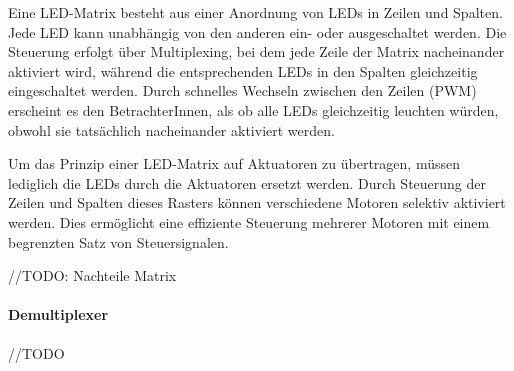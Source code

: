 Eine LED-Matrix besteht aus einer Anordnung von LEDs in Zeilen und Spalten. Jede LED kann unabhängig von den anderen
ein- oder ausgeschaltet werden. Die Steuerung erfolgt über Multiplexing, bei dem jede Zeile der Matrix nacheinander
aktiviert wird, während die entsprechenden LEDs in den Spalten gleichzeitig eingeschaltet werden. Durch schnelles
Wechseln zwischen den Zeilen (PWM) erscheint es den BetrachterInnen, als ob alle LEDs gleichzeitig leuchten würden,
obwohl sie tatsächlich nacheinander aktiviert werden. \newline

Um das Prinzip einer LED-Matrix auf Aktuatoren zu übertragen, müssen lediglich die LEDs durch die Aktuatoren ersetzt werden.
Durch Steuerung der Zeilen und Spalten dieses Rasters können verschiedene Motoren selektiv
aktiviert werden. Dies ermöglicht eine effiziente Steuerung mehrerer Motoren mit einem begrenzten Satz von
Steuersignalen.

//TODO: Nachteile Matrix


\paragraph{Demultiplexer}
//TODO \newline
